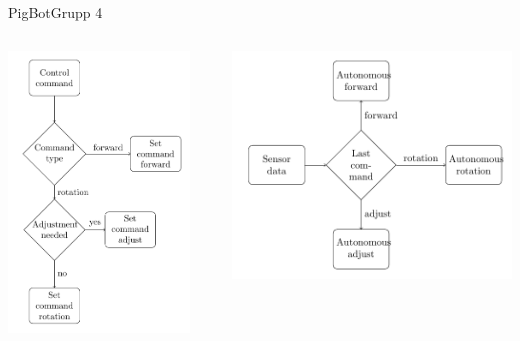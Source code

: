 \begin{frame}{PigBot}{Grupp 4}
	\begin{columns}
		\begin{column}{0.5\textwidth}
			\includegraphics[width=0.9\textwidth]{images/controllerControlFlow.pdf}
		\end{column}
		\pause
    		\begin{column}{0.5\textwidth}
      			\includegraphics[width=\textwidth]{images/controllerSensorFlow.pdf}
    		\end{column}
  	\end{columns}
\end{frame}

